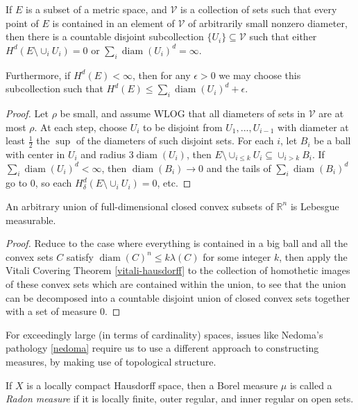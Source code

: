 \documentclass[letterpaper,11pt]{report}
\DeclareMathOperator{\diam}{diam}
\begin{document}
\begin{thm}\label{vitali-hausdorff} If $E$ is a subset of a metric space, and $\mathcal{V}$ is a collection of sets such that every point of $E$ is contained in an element of $\mathcal{V}$ of arbitrarily small nonzero diameter, then there is a countable disjoint subcollection $\{U_i\} \subseteq \mathcal{V}$ such that either $H^d(E\setminus \cup_i U_i) = 0$ or $\sum_i \diam(U_i)^d = \infty$.

Furthermore, if $H^d(E) < \infty$, then for any $\epsilon > 0$ we may choose this subcollection such that $H^d(E) \le \sum_i \diam(U_i)^d + \epsilon$.
\end{thm}
\begin{proof} Let $\rho$ be small, and assume WLOG that all diameters of sets in $\mathcal{V}$ are at most $\rho$. At each step, choose $U_i$ to be disjoint from $U_1, ..., U_{i-1}$ with diameter at least $\frac{1}{2}$ the $\sup$ of the diameters of such disjoint sets. For each $i$, let $B_i$ be a ball with center in $U_i$ and radius $3\diam(U_i)$, then $E\setminus \cup_{i \le k} U_i \subseteq \cup_{i > k} B_i$. If $\sum_i \diam(U_i)^d < \infty$, then $\diam(B_i) \rightarrow 0$ and the tails of $\sum_i \diam(B_i)^d$ go to $0$, so each $H^d_\delta(E\setminus \cup_i U_i) = 0$, etc.
\end{proof}

\begin{cor} An arbitrary union of full-dimensional closed convex subsets of $\mathbb{R}^n$ is Lebesgue measurable.
\end{cor}
\begin{proof} Reduce to the case where everything is contained in a big ball and all the convex sets $C$ satisfy $\diam(C)^n \le k\lambda(C)$ for some integer $k$, then apply the Vitali Covering Theorem \ref{vitali-hausdorff} to the collection of homothetic images of these convex sets which are contained within the union, to see that the union can be decomposed into a countable disjoint union of closed convex sets together with a set of measure $0$.
\end{proof}

For exceedingly large (in terms of cardinality) spaces, issues like Nedoma's pathology \ref{nedoma} require us to use a different approach to constructing measures, by making use of topological structure.

\begin{defn} If $X$ is a locally compact Hausdorff space, then a Borel measure $\mu$ is called a \emph{Radon measure} if it is locally finite, outer regular, and inner regular on open sets.
\end{defn}
\end{document}
